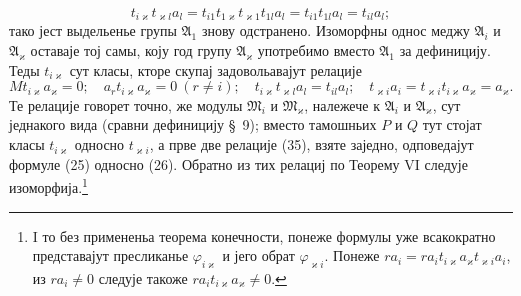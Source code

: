 ﻿\documentclass[11pt]{article}
\begin{document}
\[
 t_{i\varkappa}t_{\varkappa l}a_l=t_{i1}t_{1\varkappa}t_{\varkappa1}t_{1l}a_l
 =t_{i1}t_{1l}a_l=t_{il}a_l;
\]
тако јест выдельенье групы \(\mathfrak A_1\) знову одстранено. Изоморфны однос меджу \(\mathfrak A_i\) и \(\mathfrak A_\varkappa\) оставаје тој самы, коју год групу \(\mathfrak A_\varkappa\) употребимо вместо \(\mathfrak A_1\) за дефиницију. Теды \(t_{i\varkappa}\) сут класы, кторе скупај задовольавајут релације
\begin{equation}
 Mt_{i\varkappa}a_\varkappa=0;
 \quad a_rt_{i\varkappa}a_\varkappa=0\ (r\ne i);
 \quad t_{i\varkappa}t_{\varkappa l}a_l=t_{il}a_l;
 \quad t_{\varkappa i}a_i=t_{\varkappa i}t_{i\varkappa}a_\varkappa=a_\varkappa.
\tag{35}
\end{equation}
Те релације говорет точно, же модулы \(\mathfrak M_i\) и \(\mathfrak M_\varkappa\), належече к \(\mathfrak A_i\) и \(\mathfrak A_\varkappa\), сут једнакого вида (сравни дефиницију \S~9); вместо тамошньих \(P\) и \(Q\) тут стојат класы \(t_{i\varkappa}\) односно \(t_{\varkappa i}\), а прве две релације (35), взяте заједно, одповедајут формуле (25) односно (26). Обратно из тих релациј по Теорему VI следује изоморфија.\footnote{I то без примененьа теорема конечности, понеже формулы уже всакократно представајут пресликанье \(\varphi_{i\varkappa}\) и јего обрат \(\varphi_{\varkappa i}\). Понеже \(ra_i=ra_it_{i\varkappa}a_\varkappa t_{\varkappa i}a_i\), из \(ra_i\ne0\) следује такоже \(ra_it_{i\varkappa}a_\varkappa\ne0\).}
\end{document}
